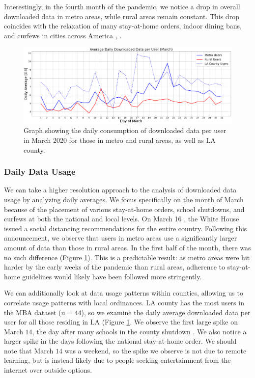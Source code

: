 Interestingly, in the fourth month of the pandemic, we notice a drop in overall downloaded data in metro areas, while rural areas remain constant. This drop coincides with the relaxation of many stay-at-home orders, indoor dining bans, and curfews in cities across America \cite{money2020la}, \cite{gov2020nyc}. 

\begin{figure}
\centering
\includegraphics[width=1.0\linewidth]{figs/daily_downloaded_data.png}
\caption{Graph showing the daily consumption of downloaded data per user in March 2020 for those in metro and rural areas, as well as LA county.}
\label{fig:dailymetro_rural}
\end{figure}

\subsubsection{Daily Data Usage}
We can take a higher resolution approach to the analysis of downloaded data usage by analyzing daily averages. We focus specifically on the month of March because of the placement of various stay-at-home orders, school shutdowns, and curfews at both the national and local levels. On March 16 \cite{trump2020coronavirus}, the White House issued a social distancing recommendations for the entire country. Following this announcement, we observe that users in metro areas use a significantly larger amount of data than those in rural areas. In the first half of the month, there was no such difference (Figure \ref{fig:dailymetro_rural}). This is a predictable result: as metro areas were hit harder by the early weeks of the pandemic than rural areas, adherence to stay-at-home guidelines would likely have been followed more stringently. 

We can additionally look at data usage patterns within counties, allowing us to correlate usage patterns with local ordinances. LA county has the most users in the MBA dataset ($n=44$), so we examine the daily average downloaded data per user for all those residing in LA (Figure \ref{fig:dailymetro_rural}. We observe the first large spike on March $14$, the day after many schools in the county shutdown \cite{haire2020LA}. We also notice a larger spike in the days following the national stay-at-home order. We should note that March $14$ was a weekend, so the spike we observe is not due to remote learning, but is instead likely due to people seeking entertainment from the internet over outside options. 

